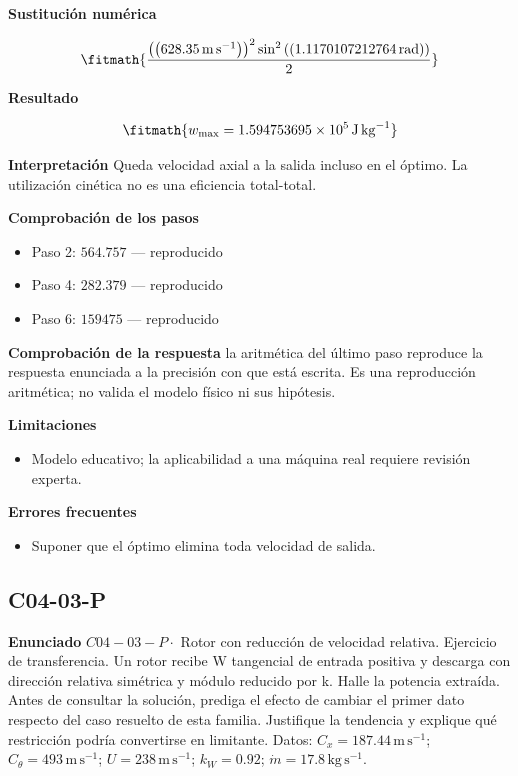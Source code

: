 \documentclass[10pt,openany]{book}
\begin{document}


\noindent\textbf{Sustitución numérica}

\[
\fitmath{\frac{\left(\left(628.35\,\mathrm{m}\,\mathrm{s}^{-1}\right)\right)^{2} \sin^{2}{\left(\left(1.1170107212764\,\mathrm{rad}\right) \right)}}{2}}
\]

\noindent\textbf{Resultado}

\[
\fitmath{w_{\max}=1.594753695\times10^{5}\,\mathrm{J}\,\mathrm{kg}^{-1}}
\]

\noindent\textbf{Interpretación}
Queda velocidad axial a la salida incluso en el óptimo. La utilización cinética no es una eficiencia total-total.

\noindent\textbf{Comprobación de los pasos}
\begin{itemize}
\item Paso 2: $564.757$ — reproducido
\item Paso 4: $282.379$ — reproducido
\item Paso 6: $159475$ — reproducido
\end{itemize}

\noindent\textbf{Comprobación de la respuesta} la aritmética del último paso reproduce la respuesta enunciada a la precisión con que está escrita. Es una reproducción aritmética; no valida el modelo físico ni sus hipótesis.

\noindent\textbf{Limitaciones}
\begin{itemize}
\item Modelo educativo; la aplicabilidad a una máquina real requiere revisión experta.
\end{itemize}

\noindent\textbf{Errores frecuentes}
\begin{itemize}
\item Suponer que el óptimo elimina toda velocidad de salida.
\end{itemize}
\subsection*{C04-03-P}

\noindent\textbf{Enunciado}
\(C04-03-P \cdot\) Rotor con reducción de velocidad relativa. Ejercicio de transferencia. Un rotor recibe W tangencial de entrada positiva y descarga con dirección relativa simétrica y módulo reducido por k. Halle la potencia extraída. Antes de consultar la solución, prediga el efecto de cambiar el primer dato respecto del caso resuelto de esta familia. Justifique la tendencia y explique qué restricción podría convertirse en limitante. Datos: \(C_x=187.44\, \mathrm{m}\,\mathrm{s}^{-1}\); \(C_\theta=493\, \mathrm{m}\,\mathrm{s}^{-1}\); \(U=238\, \mathrm{m}\,\mathrm{s}^{-1}\); \(k_W=0.92\); \(\dot m=17.8\, \mathrm{kg}\,\mathrm{s}^{-1}\).
\end{document}
